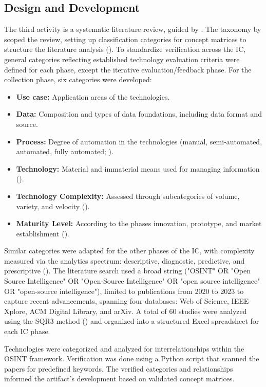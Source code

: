 \documentclass[10pt]{article}
\begin{document}
\subsection{Design and Development}
The third activity is a systematic literature review, guided by \textcite{Cleven.2009}.  The taxonomy by \textcite{Cooper.1988} scoped the review, setting up classification categories for concept matrices to structure the literature analysis (\cite{Webster.2002}).
To standardize verification across the IC, general categories reflecting established technology evaluation criteria were defined for each phase, except the iterative evaluation/feedback phase. For the collection phase, six categories were developed:
\begin{itemize}
    \item \textbf{Use case:} Application areas of the technologies.
    \item \textbf{Data:} Composition and types of data foundations, including data format and source.
    \item \textbf{Process:} Degree of automation in the technologies (manual, semi-automated, automated, fully automated; \cite{Duncheon.2002, Billings.1997, Endsley.1999}).
    \item \textbf{Technology:} Material and immaterial means used for managing information (\cite{Bleck.2004}).
    \item \textbf{Technology Complexity:} Assessed through subcategories of volume, variety, and velocity (\cite{Singh.2012}).
    \item \textbf{Maturity Level:} According to the phases innovation, prototype, and  market establishment (\cite{Stich.2022}).
\end{itemize}

Similar categories were adapted for the other phases of the IC, with complexity measured via the analytics spectrum: descriptive, diagnostic, predictive, and prescriptive (\cite{Delen.2013}). The literature search used a broad string ("OSINT" OR "Open Source Intelligence" OR "Open-Source Intelligence" OR "open source intelligence" OR "open-source intelligence"), limited to publications from 2020 to 2023 to capture recent advancements, spanning four databases: Web of Science, IEEE Xplore, ACM Digital Library, and arXiv. A total of 60 studies were analyzed using the SQR3 method (\cite{Robinson.1970}) and organized into a structured Excel spreadsheet for each IC phase.

Technologies were categorized and analyzed for interrelationships within the OSINT framework. Verification was done using a Python script that scanned the papers for predefined keywords. The verified categories and relationships informed the artifact's development based on validated concept matrices.
\end{document}
